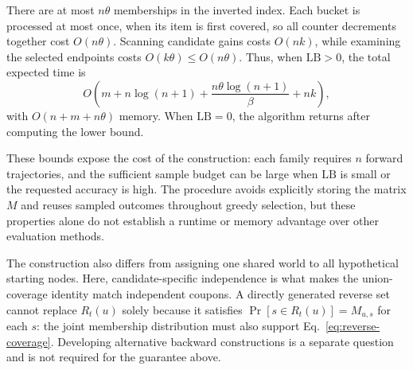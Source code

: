 \documentclass[sigconf]{acmart}
\newcommand{\CIMRIS}{\textsc{CIM-RIS}}
\begin{document}
There are at most $n\theta$ memberships in the inverted index.
Each bucket is processed at most once, when its item is first
covered, so all counter decrements together cost $O(n\theta)$.
Scanning candidate gains costs $O(nk)$, while examining the
selected endpoints costs $O(k\theta)\le O(n\theta)$.
Thus, when $\mathrm{LB}>0$, the total expected time is
\begin{equation}
\label{eq:total-complexity}
 O\left(m+n\log(n+1)+\frac{n\theta\log(n+1)}{\beta}+nk\right),
\end{equation}
with $O(n+m+n\theta)$ memory. When $\mathrm{LB}=0$, the algorithm
returns after computing the lower bound.

These bounds expose the cost of the construction: each family
requires $n$ forward trajectories, and the sufficient sample
budget can be large when $\mathrm{LB}$ is small or the requested
accuracy is high. The procedure avoids explicitly storing the
matrix $M$ and reuses sampled outcomes throughout greedy selection,
but these properties alone do not establish a runtime or memory
advantage over other evaluation methods.

The construction also differs from assigning one shared world
to all hypothetical starting nodes. Here, candidate-specific
independence is what makes the union-coverage identity match
independent coupons. A directly generated reverse set cannot
replace $R_t(u)$ solely because it satisfies
$\Pr[s\in R_t(u)]=M_{u,s}$ for each $s$: the joint membership
distribution must also support Eq.~\eqref{eq:reverse-coverage}.
Developing alternative backward constructions is a separate
question and is not required for the guarantee above.










\end{document}
